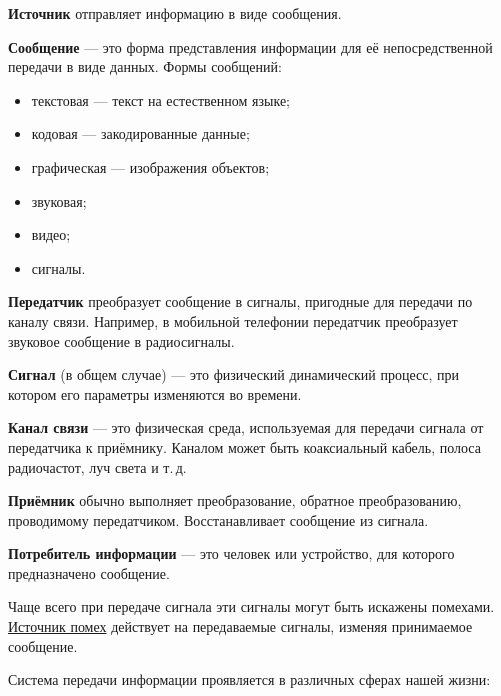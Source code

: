 \documentclass[a4paper, 12pt]{article}
\begin{document}
\textbf{Источник} отправляет информацию в виде сообщения.

\textbf{Сообщение} --- это форма представления информации для её
непосредственной передачи в виде данных. Формы сообщений:
\begin{itemize}[noitemsep]
  \item текстовая --- текст на естественном языке;
  \item кодовая --- закодированные данные;
  \item графическая --- изображения объектов;
  \item звуковая;
  \item видео;
  \item сигналы.
\end{itemize}

\textbf{Передатчик} преобразует сообщение в сигналы, пригодные для передачи
по каналу связи. Например, в мобильной телефонии передатчик преобразует
звуковое сообщение в радиосигналы.

\textbf{Сигнал} (в общем случае) --- это физический динамический процесс,
при котором его параметры изменяются во времени.

\textbf{Канал связи} --- это физическая среда, используемая для передачи
сигнала от передатчика к приёмнику. Каналом может быть коаксиальный кабель,
полоса радиочастот, луч света и т.\,д.

\textbf{Приёмник} обычно выполняет преобразование, обратное преобразованию,
проводимому передатчиком. Восстанавливает сообщение из сигнала.

\textbf{Потребитель информации} --- это человек или устройство, для которого
предназначено сообщение.

Чаще всего при передаче сигнала эти сигналы могут быть искажены помехами.
\underline{Источник помех} действует на передаваемые сигналы, изменяя
принимаемое сообщение.

Система передачи информации проявляется в различных сферах нашей жизни:
\end{document}
